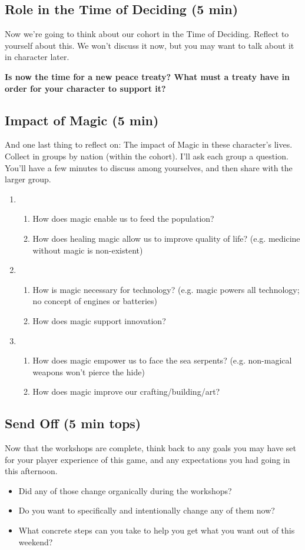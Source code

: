\documentclass[green]{GL2020}
\begin{document}
\subsection*{Role in the Time of Deciding (5 min)}
Now we’re going to think about our cohort in the Time of Deciding. Reflect to yourself about this. We won't discuss it now, but you may want to talk about it in character later.

\textbf{Is now the time for a new peace treaty? What must a treaty have in order for your character to support it?}

\subsection*{Impact of Magic (5 min)}
And one last thing to reflect on: The impact of Magic in these character’s lives. Collect in groups by nation (within the cohort). I’ll ask each group a question. You’ll have a few minutes to discuss among yourselves, and then share with the larger group.
\begin{enumerate}
	\item \pFarm{}
	\begin{enumerate}
		\item How does magic enable us to feed the population?
		\item How does healing magic allow us to improve quality of life? (e.g. medicine without magic is non-existent)
	\end{enumerate}
	\item \pTech{}
	\begin{enumerate}
		\item How is magic necessary for technology? (e.g. magic powers all technology; no concept of engines or batteries)
		\item How does magic support innovation?
	\end{enumerate}
	\item \pShip{}
	\begin{enumerate}
		\item How does magic empower us to face the sea serpents? (e.g. non-magical weapons won’t pierce the hide)
		\item How does magic improve our crafting/building/art?
	\end{enumerate}
\end{enumerate}

\subsection*{Send Off (5 min tops)}
Now that the workshops are complete, think back to any goals you may have set for your player experience of this game, and any expectations you had going in this afternoon. 
\begin{itemize}
	\item Did any of those change organically during the workshops? 
	\item Do you want to specifically and intentionally change any of them now? 
	\item What concrete steps can you take to help you get what you want out of this weekend?
\end{itemize}
\end{document}
